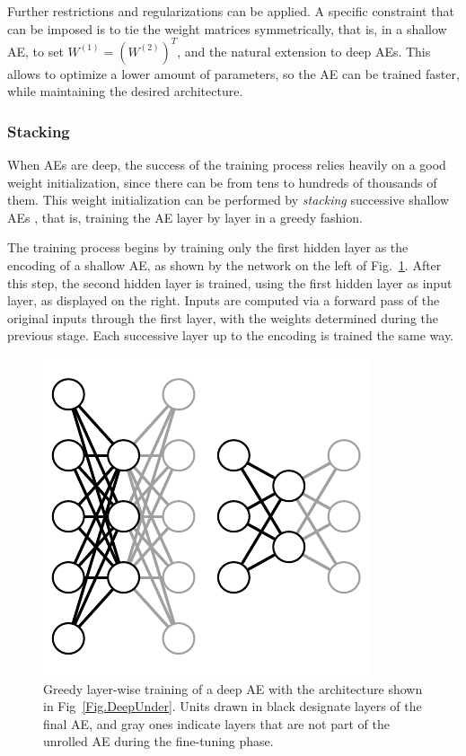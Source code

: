 \documentclass[preprint,5p,compress]{elsarticle}
\begin{document}
Further restrictions and regularizations can be applied. A specific constraint that can be imposed is to tie the weight matrices symmetrically, that is, in a shallow AE, to set $W^{(1)}=(W^{(2)})^T$, and the natural extension to deep AEs. This allows to optimize a lower amount of parameters, so the AE can be trained faster, while maintaining the desired architecture.

\subsubsection{Stacking}

When AEs are deep, the success of the training process relies heavily on a good weight initialization, since there can be from tens to hundreds of thousands of them. This weight initialization can be performed by \textit{stacking} successive shallow AEs \cite{LayerwiseTraining}, that is, training the AE layer by layer in a greedy fashion.

The training process begins by training only the first hidden layer as the encoding of a shallow AE, as shown by the network on the left of Fig.~\ref{Fig.StackedAutoencoder}. After this step, the second hidden layer is trained, using the first hidden layer as input layer, as displayed on the right. Inputs are computed via a forward pass of the original inputs through the first layer, with the weights determined during the previous stage. Each successive layer up to the encoding is trained the same way.

\begin{figure}[ht!]
  \centering
  \includegraphics{Stacked}
  \caption{\label{Fig.StackedAutoencoder}Greedy layer-wise training of a deep AE with the architecture shown in Fig~\ref{Fig.DeepUnder}. Units drawn in black designate layers of the final AE, and gray ones indicate layers that are not part of the unrolled AE during the fine-tuning phase.}
\end{figure}
\end{document}
